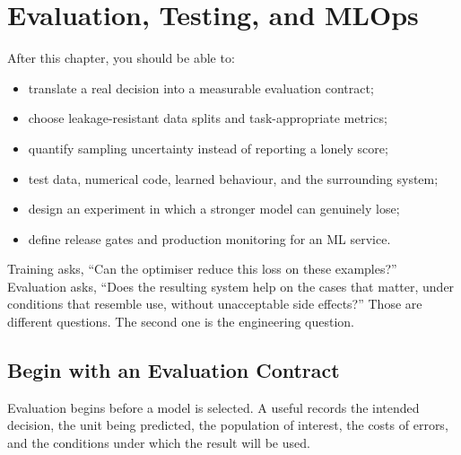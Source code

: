 
\chapter{Evaluation, Testing, and MLOps}

\label{ch:evaluation-mlops}

\begin{learningobjectives}
After this chapter, you should be able to:
\begin{itemize}
    \item translate a real decision into a measurable evaluation contract;
    \item choose leakage-resistant data splits and task-appropriate metrics;
    \item quantify sampling uncertainty instead of reporting a lonely score;
    \item test data, numerical code, learned behaviour, and the surrounding
          system;
    \item design an experiment in which a stronger model can genuinely lose;
    \item define release gates and production monitoring for an ML service.
\end{itemize}
\end{learningobjectives}

\begin{plainlanguage}
Training asks, ``Can the optimiser reduce this loss on these examples?''
Evaluation asks, ``Does the resulting system help on the cases that matter,
under conditions that resemble use, without unacceptable side effects?''
Those are different questions.
The second one is the engineering question.
\end{plainlanguage}

\section{Begin with an Evaluation Contract}

Evaluation begins before a model is selected.
A useful  records the intended decision, the unit
being predicted, the population of interest, the costs of errors, and the
conditions under which the result will be used.

